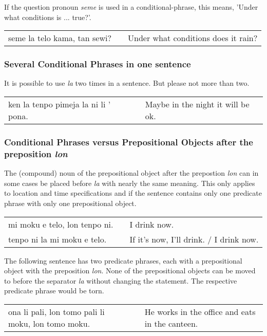 If the question pronoun \textit{seme} is used in a conditional-phrase, this means, 'Under what conditions is ... true?'.

\begin{supertabular}{p{5,5cm}|ll}
    seme la telo kama, tan sewi? &  & Under what conditions does it rain? \\
\end{supertabular}

\subsubsection*{Several Conditional Phrases in one sentence}
It is possible to use \textit{la} two times in a sentence.
But please not more than two.

\begin{supertabular}{p{5,5cm}|ll}
    ken la tenpo pimeja la ni li ' pona. &  & Maybe in the night it will be ok. \\
\end{supertabular}

\subsubsection*{Conditional Phrases versus Prepositional Objects after the preposition \textit{lon} }
The (compound) noun of the prepositional object after the prepostion \textit{lon} can in some cases be placed before \textit{la} with nearly the same meaning.
This only applies to location and time specifications and if the sentence contains only one predicate phrase with only one prepositional object.

\begin{supertabular}{p{5,5cm}|ll}
    mi moku e telo, lon tenpo ni. &  & I drink now.                            \\
    tenpo ni la mi moku e telo.   &  & If it's now, I'll drink. / I drink now. \\
\end{supertabular}

The following sentence has two predicate phrases, each with a prepositional object with the preposition \textit{lon}.
None of the prepositional objects can be moved to before the separator \textit{la} without changing the statement.
The respective predicate phrase would be torn.

\begin{supertabular}{p{5,5cm}|ll}
    ona li pali, lon tomo pali li moku, lon tomo moku. &  & He works in the office and eats in the canteen. \\
\end{supertabular}

